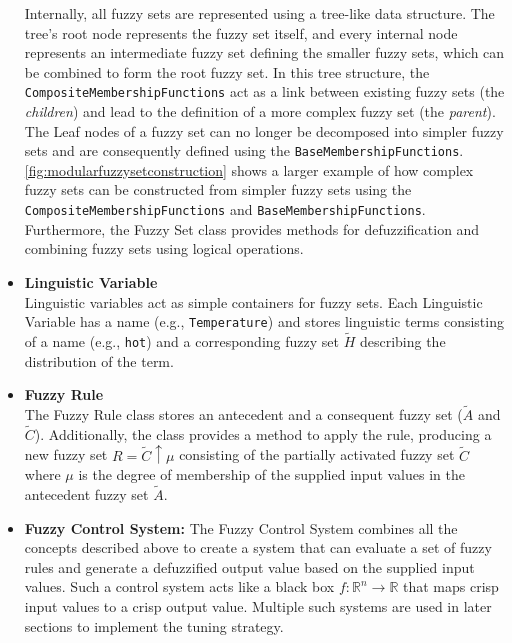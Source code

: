 \begin{itemize}
        \smallskip
        Internally, all fuzzy sets are represented using a tree-like data structure. The tree's root node represents the fuzzy set itself, and every internal node represents an intermediate fuzzy set defining the smaller fuzzy sets, which can be combined to form the root fuzzy set. In this tree structure, the \texttt{CompositeMembershipFunctions} act as a link between existing fuzzy sets (the \emph{children}) and lead to the definition of a more complex fuzzy set (the \emph{parent}). The Leaf nodes of a fuzzy set can no longer be decomposed into simpler fuzzy sets and are consequently defined using the \texttt{BaseMembershipFunctions}.
        \autoref{fig:modularfuzzysetconstruction} shows a larger example of how complex fuzzy sets can be constructed from simpler fuzzy sets using the \texttt{CompositeMembershipFunctions} and \texttt{BaseMembershipFunctions}. \\
        Furthermore, the Fuzzy Set class provides methods for defuzzification and combining fuzzy sets using logical operations.

  \item \textbf{Linguistic Variable}\\
        Linguistic variables act as simple containers for fuzzy sets. Each Linguistic Variable has a name (e.g., \texttt{Temperature}) and stores linguistic terms consisting of a name (e.g., \texttt{hot}) and a corresponding fuzzy set $\tilde{H}$ describing the distribution of the term.

  \item \textbf{Fuzzy Rule}\\
        The Fuzzy Rule class stores an antecedent and a consequent fuzzy set ($\tilde{A}$ and $\tilde{C}$). Additionally, the class provides a method to apply the rule, producing a new fuzzy set $R=\tilde{C}\uparrow \mu$ consisting of the partially activated fuzzy set $\tilde{C}$ where $\mu$ is the degree of membership of the supplied input values in the antecedent fuzzy set $\tilde{A}$.

  \item \textbf{Fuzzy Control System:} The Fuzzy Control System combines all the concepts described above to create a system that can evaluate a set of fuzzy rules and generate a defuzzified output value based on the supplied input values. Such a control system acts like a black box $f: \mathbb{R}^n \rightarrow \mathbb{R}$ that maps crisp input values to a crisp output value. Multiple such systems are used in later sections to implement the tuning strategy.
\end{itemize}


